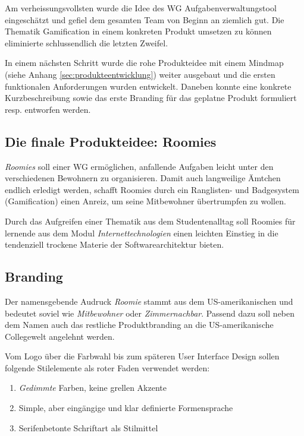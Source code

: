 Am verheissungsvollsten wurde die Idee des \gls{WG} Aufgabenverwaltungstool eingeschätzt und gefiel dem gesamten Team von Beginn an ziemlich gut. Die Thematik \gls{Gamification} in einem konkreten Produkt umsetzen zu können eliminierte schlussendlich die letzten Zweifel.

In einem nächsten Schritt wurde die rohe Produkteidee mit einem Mindmap (siehe Anhang \ref{sec:produkteentwicklung}) weiter ausgebaut und die ersten funktionalen Anforderungen wurden entwickelt. Daneben konnte eine konkrete Kurzbeschreibung sowie das erste Branding für das geplatne Produkt formuliert resp. entworfen werden.


\subsection{Die finale Produkteidee: Roomies}
\emph{Roomies} soll einer \gls{WG} ermöglichen, anfallende Aufgaben leicht unter den verschiedenen Bewohnern zu organisieren. Damit auch langweilige Ämtchen endlich erledigt werden, schafft Roomies durch ein Ranglisten- und Badgesystem (\gls{Gamification}) einen Anreiz, um seine Mitbewohner übertrumpfen zu wollen.

Durch das Aufgreifen einer Thematik aus dem Studentenalltag soll Roomies für lernende aus dem Modul \emph{Internettechnologien} einen leichten Einstieg in die tendenziell trockene Materie der Softwarearchitektur bieten.

\subsection{Branding}
Der namensgebende Audruck \emph{Roomie} stammt aus dem US-amerikanischen und bedeutet soviel wie \emph{Mitbewohner} oder \emph{Zimmernachbar}\cite{Roomie}. Passend dazu soll neben dem Namen auch das restliche Produktbranding an die US-amerikanische Collegewelt angelehnt werden.

Vom Logo über die Farbwahl bis zum späteren User Interface Design sollen folgende Stilelemente als roter Faden verwendet werden:

\begin{enumerate}
	\item \emph{Gedimmte} Farben, keine grellen Akzente
	\item Simple, aber eingängige und klar definierte Formensprache
	\item Serifenbetonte Schriftart als Stilmittel
\end{enumerate}


